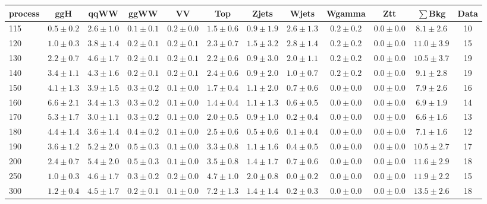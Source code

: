 \begin{table}[!hb]
{\footnotesize
 \begin{center}
 \begin{tabular}{l c c c c c c c c c c c }
 \hline
 process & ggH & qqWW & ggWW & VV & Top & Zjets & Wjets & Wgamma & Ztt & $\sum$Bkg & Data \\
 \hline
115 & $0.5\pm0.2$ & $2.6\pm1.0$ & $0.1\pm0.1$ & $0.2\pm0.0$ & $1.5\pm0.6$ & $0.9\pm1.9$ & $2.6\pm1.3$ & $0.2\pm0.2$ & $0.0\pm0.0$ & $8.1\pm2.6$ & 10 \\
120 & $1.0\pm0.3$ & $3.8\pm1.4$ & $0.2\pm0.1$ & $0.2\pm0.1$ & $2.3\pm0.7$ & $1.5\pm3.2$ & $2.8\pm1.4$ & $0.2\pm0.2$ & $0.0\pm0.0$ & $11.0\pm3.9$ & 15 \\
130 & $2.2\pm0.7$ & $4.6\pm1.7$ & $0.2\pm0.1$ & $0.2\pm0.1$ & $2.2\pm0.6$ & $0.9\pm3.0$ & $2.0\pm1.1$ & $0.2\pm0.2$ & $0.0\pm0.0$ & $10.5\pm3.7$ & 19 \\
140 & $3.4\pm1.1$ & $4.3\pm1.6$ & $0.2\pm0.1$ & $0.2\pm0.1$ & $2.4\pm0.6$ & $0.9\pm2.0$ & $1.0\pm0.7$ & $0.2\pm0.2$ & $0.0\pm0.0$ & $9.1\pm2.8$ & 19 \\
150 & $4.1\pm1.3$ & $3.9\pm1.5$ & $0.3\pm0.2$ & $0.1\pm0.0$ & $1.7\pm0.4$ & $1.1\pm2.0$ & $0.7\pm0.6$ & $0.0\pm0.0$ & $0.0\pm0.0$ & $7.9\pm2.6$ & 16 \\
160 & $6.6\pm2.1$ & $3.4\pm1.3$ & $0.3\pm0.2$ & $0.1\pm0.0$ & $1.4\pm0.4$ & $1.1\pm1.3$ & $0.6\pm0.5$ & $0.0\pm0.0$ & $0.0\pm0.0$ & $6.9\pm1.9$ & 14 \\
170 & $5.3\pm1.7$ & $3.0\pm1.1$ & $0.3\pm0.2$ & $0.1\pm0.0$ & $2.0\pm0.5$ & $0.9\pm1.0$ & $0.2\pm0.4$ & $0.0\pm0.0$ & $0.0\pm0.0$ & $6.6\pm1.6$ & 13 \\
180 & $4.4\pm1.4$ & $3.6\pm1.4$ & $0.4\pm0.2$ & $0.1\pm0.0$ & $2.5\pm0.6$ & $0.5\pm0.6$ & $0.1\pm0.4$ & $0.0\pm0.0$ & $0.0\pm0.0$ & $7.1\pm1.6$ & 12 \\
190 & $3.6\pm1.2$ & $5.2\pm2.0$ & $0.5\pm0.3$ & $0.1\pm0.0$ & $3.3\pm0.8$ & $1.1\pm1.6$ & $0.4\pm0.5$ & $0.0\pm0.0$ & $0.0\pm0.0$ & $10.5\pm2.7$ & 17 \\
200 & $2.4\pm0.7$ & $5.4\pm2.0$ & $0.5\pm0.3$ & $0.1\pm0.0$ & $3.5\pm0.8$ & $1.4\pm1.7$ & $0.7\pm0.6$ & $0.0\pm0.0$ & $0.0\pm0.0$ & $11.6\pm2.9$ & 18 \\
250 & $1.0\pm0.3$ & $4.6\pm1.7$ & $0.3\pm0.2$ & $0.2\pm0.0$ & $4.7\pm1.0$ & $2.0\pm0.8$ & $0.0\pm0.2$ & $0.0\pm0.0$ & $0.0\pm0.0$ & $11.9\pm2.2$ & 15 \\
300 & $1.2\pm0.4$ & $4.5\pm1.7$ & $0.2\pm0.1$ & $0.1\pm0.0$ & $7.2\pm1.3$ & $1.4\pm1.4$ & $0.2\pm0.3$ & $0.0\pm0.0$ & $0.0\pm0.0$ & $13.5\pm2.6$ & 18 \\

\end{tabular}
\end{center}}
\end{table}
